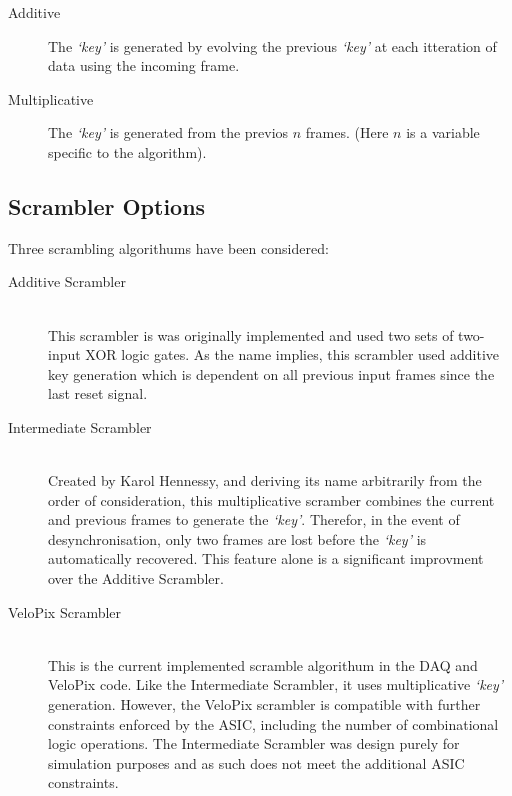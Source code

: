 	\begin{description}
		\item[Additive] The \textit{`key'} is generated by evolving the previous \textit{`key'} at each itteration of data using the incoming frame.
		\item[Multiplicative] The  \textit{`key'} is generated from the previos $n$ frames. (Here $n$ is a variable specific to the algorithm).
	\end{description}

	\subsection{Scrambler Options}
	\label{sub:scrambler_options}

		Three scrambling algorithums have been considered:

		\begin{description}
			\item[Additive Scrambler] \hfill \\
				This scrambler is was originally implemented and used two sets of two-input XOR logic gates.
				As the name implies, this scrambler used additive key generation which is dependent on all previous input frames since the last reset signal.

			\item[Intermediate Scrambler] \hfill \\
				Created by Karol Hennessy, and deriving its name arbitrarily from the order of consideration, this multiplicative scramber combines the current and previous frames to generate the \textit{`key'}.
				Therefor, in the event of desynchronisation, only two frames are lost before the \textit{`key'} is automatically recovered.
				This feature alone is a significant improvment over the Additive Scrambler.

			\item[VeloPix Scrambler] \hfill \\
				This is the current implemented scramble algorithum in the DAQ and VeloPix code.
				Like the Intermediate Scrambler, it uses multiplicative \textit{`key'} generation.
				However, the VeloPix scrambler is compatible with further constraints enforced by the ASIC, including the number of combinational logic operations.
				The Intermediate Scrambler was design purely for simulation purposes and as such does not meet the additional ASIC constraints.
		\end{description}


